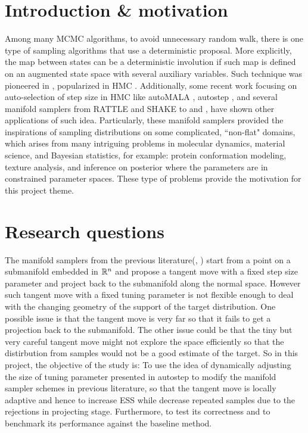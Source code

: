 \documentclass{article}
\begin{document}

\section{Introduction \& motivation}
Among many MCMC algorithms, to avoid unnecessary random walk, there is one type of sampling algorithms that use a deterministic proposal. More explicitly, the map between states can be a deterministic involution if such map is defined on an augmented state space with several auxiliary variables. Such technique was pioneered in \cite{tierney1998}, popularized in HMC \cite{nealHMC}. Additionally, some recent work focusing on auto-selection of step size in HMC like autoMALA \cite{automala}, autostep \cite{autostep}, and several manifold samplers from RATTLE \cite{rattle} and SHAKE \cite{shake} to \cite{manifoldparent} and \cite{Lelievrehmc2019}, have shown other applications of such idea. Particularly, these manifold samplers provided the inspirations of sampling distributions on some complicated, ``non-flat" domains, which arises from many intriguing problems in molecular dynamics, material science, and Bayesian statistics, for example: protein conformation modeling, texture analysis, and inference on posterior where the parameters are in constrained parameter spaces. These type of problems provide the motivation for this project theme.

\section{Research questions}
The manifold samplers from the previous literature(\cite{rattle}, \cite{manifoldparent}) start from a point on a submanifold embedded in $\mathbb R^n$ and propose a tangent move with a fixed step size parameter and project back to the submanifold along the normal space. However such tangent move with a fixed tuning parameter is not flexible enough to deal with the changing geometry of the support of the target distribution. One possible issue is that the tangent move is very far so that it fails to get a projection back to the submanifold. The other issue could be that the tiny but very careful tangent move might not explore the space efficiently so that the distirbution from samples would not be a good estimate of the target. So in this project, the objective of the study is: To use the idea of dynamically adjusting the size of tuning parameter presented in autostep \cite{autostep} to modify the manifold sampler schemes in previous literature, so that the tangent move is locally adaptive and hence to increase ESS while decrease repeated samples due to the rejections in projecting stage. Furthermore, to test its correctness and to benchmark its performance against the baseline method.
\end{document}

